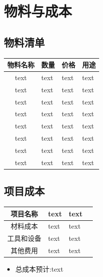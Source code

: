 \chapter{物料与成本}
\section{物料清单}
\begin{table}[h]
    \begin{tabular}{l|lll}
        \hline
        \multicolumn{1}{c|}{物料名称} & 数量   & 价格   & 用途   \\ \hline
        \multicolumn{1}{c|}{text} & text & text & text \\
        \multicolumn{1}{c|}{text} & text & text & text \\
        \multicolumn{1}{c|}{text} & text & text & text \\
        \multicolumn{1}{c|}{text} & text & text & text \\
        \multicolumn{1}{c|}{text} & text & text & text \\
        \multicolumn{1}{c|}{text} & text & text & text \\
        \multicolumn{1}{c|}{text} & text & text & text \\
        \multicolumn{1}{c|}{text} & text & text & text \\\hline
    \end{tabular}
\end{table}


\section{项目成本}
\begin{table}[h]
    \begin{tabular}{l|lll}
        \hline
        \multicolumn{1}{c|}{项目名称}  & text & text \\ \hline
        \multicolumn{1}{c|}{材料成本}  & text & text \\
        \multicolumn{1}{c|}{工具和设备} & text & text \\
        \multicolumn{1}{c|}{其他费用}  & text & text \\ \hline
    \end{tabular}
\end{table}
\begin{itemize}
    \item 总成本预计:text

\end{itemize}


